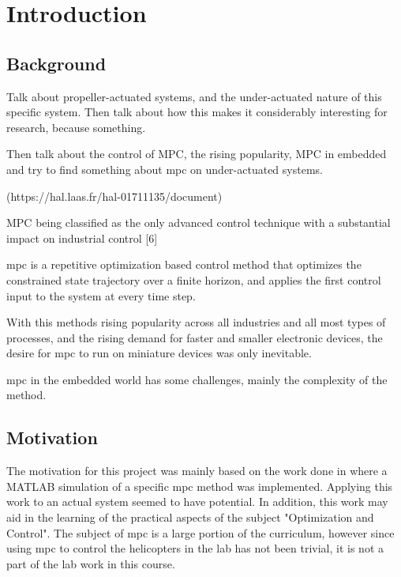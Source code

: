 
\chapter{Introduction}


\section{Background}


Talk about propeller-actuated systems, and the under-actuated nature of this specific system. Then talk about how this makes it considerably interesting for research, because something.

Then talk about the control of MPC, the rising popularity, MPC in embedded and try to find something about \acrshort{mpc} on under-actuated systems.

(https://hal.laas.fr/hal-01711135/document)


 MPC being classified as the only advanced control technique with a substantial impact on industrial control [6]
 
\acrlong{mpc} is a repetitive optimization based control method that optimizes the constrained state trajectory over a finite horizon, and applies the first control input to the system at every time step.

With this methods rising popularity across all industries and all most types of processes, and the rising demand for faster and smaller electronic devices, the desire for \acrshort{mpc} to run on miniature devices was only inevitable. 

\acrshort{mpc} in the embedded world has some challenges, mainly the complexity of the method. 


\section{Motivation}

The motivation for this project was mainly based on the work done in \cite{prosjektoppgave} where a MATLAB simulation of a specific \acrshort{mpc} method was implemented. Applying this work to an actual system seemed to have potential. In addition, this work may aid in the learning of the practical aspects of the subject "Optimization and Control". The subject of \acrshort{mpc} is a large portion of the curriculum, however since using \acrshort{mpc} to control the helicopters in the lab has not been trivial, it is not a part of the lab work in this course. 


